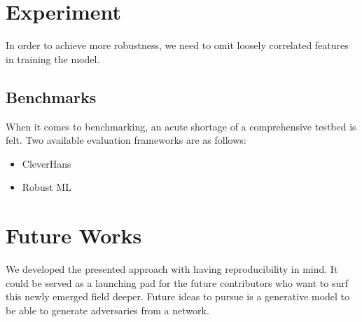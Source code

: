 \documentclass[letterpaper,12pt]{article}
\begin{document}
\section{Experiment}
In order to achieve more robustness, we need to omit loosely correlated features in training the model.

\subsection{Benchmarks}
When it comes to benchmarking, an acute shortage of a comprehensive testbed is felt. Two available evaluation frameworks are as follows:
\begin{itemize}
    \item CleverHans \cite{Papernot2016}
    \item Robust ML 
\end{itemize}
 

\section{Future Works}
We developed the presented approach with having reproducibility in mind. It could be served as a launching pad for the future contributors who want to surf this newly emerged field deeper. Future ideas to pursue is a generative model to be able to generate adversaries from a network.





\end{document}
